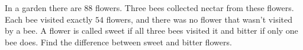 In a garden there are $88$ flowers. Three bees collected nectar from these flowers. Each bee visited exactly $54$ flowers, and there was no flower that wasn't visited by a bee. A flower is called sweet if all three bees visited it and bitter if only one bee does. Find the difference between sweet and bitter flowers.
